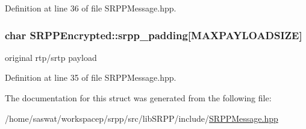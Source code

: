 Definition at line 36 of file SRPPMessage.hpp.

\hypertarget{struct_s_r_p_p_encrypted_ad4b65478c1d0521bba8788166acc6340}{
\subsubsection[{srpp\_\-padding}]{\setlength{\rightskip}{0pt plus 5cm}char {\bf SRPPEncrypted::srpp\_\-padding}\mbox{[}MAXPAYLOADSIZE\mbox{]}}}
\label{struct_s_r_p_p_encrypted_ad4b65478c1d0521bba8788166acc6340}
original rtp/srtp payload 

Definition at line 35 of file SRPPMessage.hpp.



The documentation for this struct was generated from the following file:\begin{DoxyCompactItemize}
\item 
/home/saswat/workspacep/srpp/src/libSRPP/include/\hyperlink{_s_r_p_p_message_8hpp}{SRPPMessage.hpp}\end{DoxyCompactItemize}
